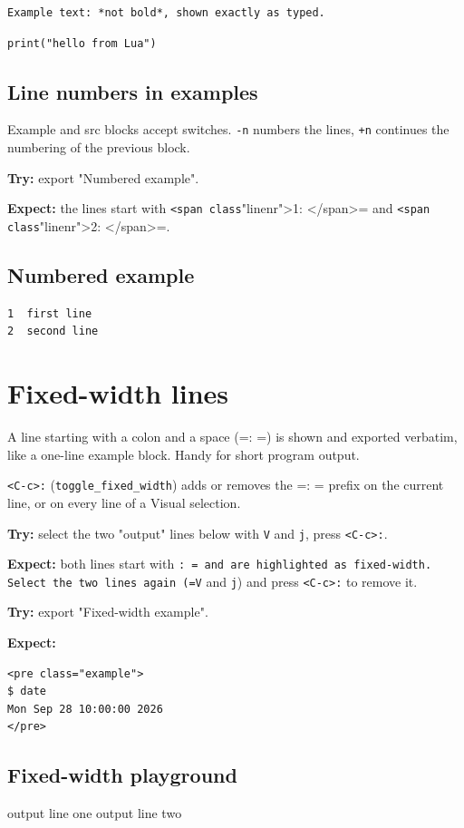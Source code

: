\begin{verbatim}
Example text: *not bold*, shown exactly as typed.
\end{verbatim}

\begin{verbatim}
print("hello from Lua")
\end{verbatim}
\subsection{Line numbers in examples}
\label{sec:org97668aa}
Example and src blocks accept switches. \texttt{-n} numbers the lines, \texttt{+n}
continues the numbering of the previous block.

\textbf{Try:} export "Numbered example".

\textbf{Expect:} the lines start with \texttt{<span class}"linenr">1: </span>= and
\texttt{<span class}"linenr">2: </span>=.
\subsection{Numbered example}
\label{sec:org8457a29}
\begin{verbatim}
1  first line
2  second line
\end{verbatim}
\section{Fixed-width lines}
\label{sec:orgd54f3f3}
A line starting with a colon and a space (=: =) is shown and exported
verbatim, like a one-line example block. Handy for short program output.

\texttt{<C-c>:} (\texttt{toggle\_fixed\_width}) adds or removes the =: = prefix on the
current line, or on every line of a Visual selection.

\textbf{Try:} select the two "output" lines below with \texttt{V} and \texttt{j}, press \texttt{<C-c>:}.

\textbf{Expect:} both lines start with \texttt{: = and are highlighted as fixed-width.
Select the two lines again (=V} and \texttt{j}) and press \texttt{<C-c>:} to remove it.

\textbf{Try:} export "Fixed-width example".

\textbf{Expect:}
\begin{verbatim}
<pre class="example">
$ date
Mon Sep 28 10:00:00 2026
</pre>
\end{verbatim}
\subsection{Fixed-width playground}
\label{sec:orgd81a00d}
output line one
output line two
